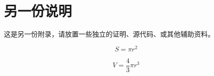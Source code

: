 \chapter{另一份说明}

这是另一份附录，请放置一些独立的证明、源代码、或其他辅助资料。

\begin{equation}
    S = \pi r^2
\end{equation}

\begin{equation}
    V = \frac43 \pi r^3
\end{equation}

\cleardoublepage
\endinput